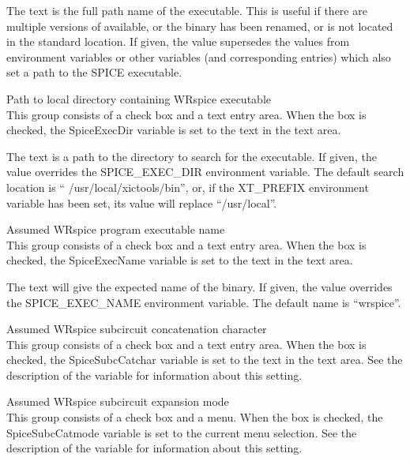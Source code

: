 \begin{description}
The text is the full path name of the {\WRspice} executable.  This is
useful if there are multiple versions of {\WRspice} available, or the
binary has been renamed, or is not located in the standard location. 
If given, the value supersedes the values from environment variables
or other variables (and corresponding entries) which also set a path
to the SPICE executable.

\item{\cb Path to local directory containing WRspice executable}\\
This group consists of a check box and a text entry area.  When the
box is checked, the {\et SpiceExecDir} variable is set to the text in
the text area.

The text is a path to the directory to search for the {\WRspice}
executable.  If given, the value overrides the {\et SPICE\_EXEC\_DIR}
environment variable.  The default search location is ``{\vt
/usr/local/xictools/bin}'', or, if the {\et XT\_PREFIX} environment
variable has been set, its value will replace ``{\vt /usr/local}''.

\item{\cb Assumed WRspice program executable name}\\
This group consists of a check box and a text entry area.  When the
box is checked, the {\et SpiceExecName} variable is set to the text in
the text area.

The text will give the expected name of the {\WRspice} binary.  If
given, the value overrides the {\et SPICE\_EXEC\_NAME} environment
variable.  The default name is ``{\vt wrspice}''.

\item{\cb Assumed WRspice subcircuit concatenation character}\\
This group consists of a check box and a text entry area.  When the
box is checked, the {\et SpiceSubcCatchar} variable is set to the text
in the text area.  See the description of the variable for information
about this setting.

\item{\cb Assumed WRspice subcircuit expansion mode}\\
This group consists of a check box and a menu.  When the box is
checked, the {\et SpiceSubcCatmode} variable is set to the current
menu selection.  See the description of the variable for information
about this setting.
\end{description}


